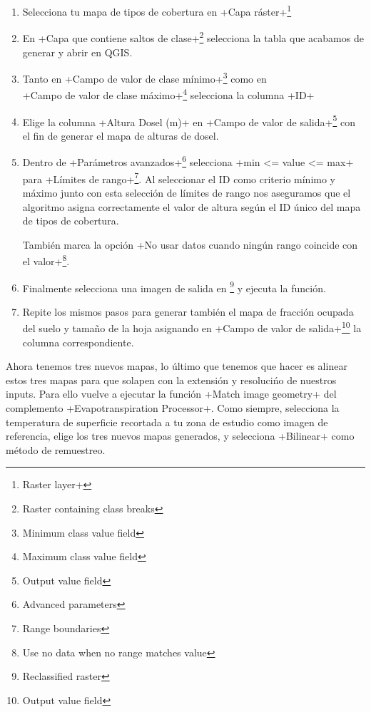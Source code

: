 \documentclass[a4paper,11pt]{article}
\begin{document}
\begin{enumerate}
       \item Selecciona tu mapa de tipos de cobertura en \cverb+Capa ráster+\footnote{Raster layer+}
       
       \item En \cverb+Capa que contiene saltos de clase+\footnote{Raster containing class breaks} selecciona la tabla que acabamos de generar y abrir en QGIS.
       
       \item Tanto en \cverb+Campo de valor de clase mínimo+\footnote{Minimum class value field} como en\\
       \cverb+Campo de valor de clase máximo+\footnote{Maximum class value field} selecciona la columna \cverb+ID+
      
       \item Elige la columna \cverb+Altura Dosel (m)+ en \cverb+Campo de valor de salida+\footnote{Output value field} con el fin de generar el mapa de alturas de dosel.
      
       \item Dentro de \cverb+Parámetros avanzados+\footnote{Advanced parameters} selecciona \cverb+min <= value <= max+ para \cverb+Límites de rango+\footnote{Range boundaries}. Al seleccionar el ID como criterio mínimo y máximo junto con esta selección de límites de rango nos aseguramos que el algoritmo asigna correctamente el valor de altura según el ID único del mapa de tipos de cobertura.
      
       También marca la opción \cverb+No usar datos cuando ningún rango coincide con el valor+\footnote{Use no data when no range matches value}.
      
       \item Finalmente selecciona una imagen de salida en \footnote{Reclassified raster} y ejecuta la función.
      
       \item Repite los mismos pasos para generar también el mapa de fracción ocupada del suelo y tamaño de la hoja asignando en \cverb+Campo de valor de salida+\footnote{Output value field} la columna correspondiente.
      \end{enumerate}
      
      Ahora tenemos tres nuevos mapas, lo último que tenemos que hacer es alinear estos tres mapas para que solapen con la extensión y resolucińo de nuestros inputs. Para ello vuelve a ejecutar la función \cverb+Match image geometry+ del complemento \cverb+Evapotranspiration Processor+. Como siempre, selecciona la temperatura de superficie recortada a tu zona de estudio como imagen de referencia, elige los tres nuevos mapas generados, y selecciona \cverb+Bilinear+ como método de remuestreo.
  
\end{document}
